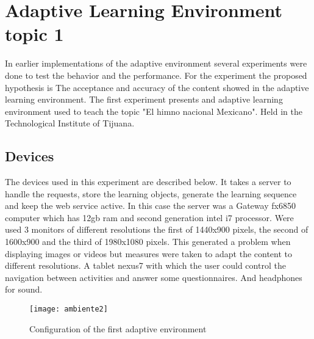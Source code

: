 \section{Adaptive Learning Environment topic 1}
In earlier implementations of the adaptive environment several experiments were done to test the behavior and the performance. For the experiment the proposed hypothesis is The acceptance and accuracy of the content showed in the adaptive learning environment. The first experiment presents and adaptive learning environment used to teach the topic "El himno nacional Mexicano". Held in the Technological Institute of Tijuana.
\subsection{Devices}
The devices used in this experiment are described below. It takes a server to handle the requests, store the learning objects, generate the learning sequence and keep the web service active. In this case the server was a Gateway fx6850 computer which has 12gb ram and second generation intel i7 processor. Were used 3 monitors of different resolutions the first of 1440x900 pixels, the second of 1600x900 and the third of 1980x1080 pixels. This generated a problem when displaying images or videos but measures were taken to adapt the content to different resolutions. A tablet nexus7 with which the user could control the navigation between activities and answer some questionnaires. And headphones for sound.

\begin{figure}[ht!]  
\centering  
\texttt{[image: ambiente2]}
\quad  
\caption{Configuration of the first adaptive environment}  
\label{ambiente2}  
\end{figure}
  

